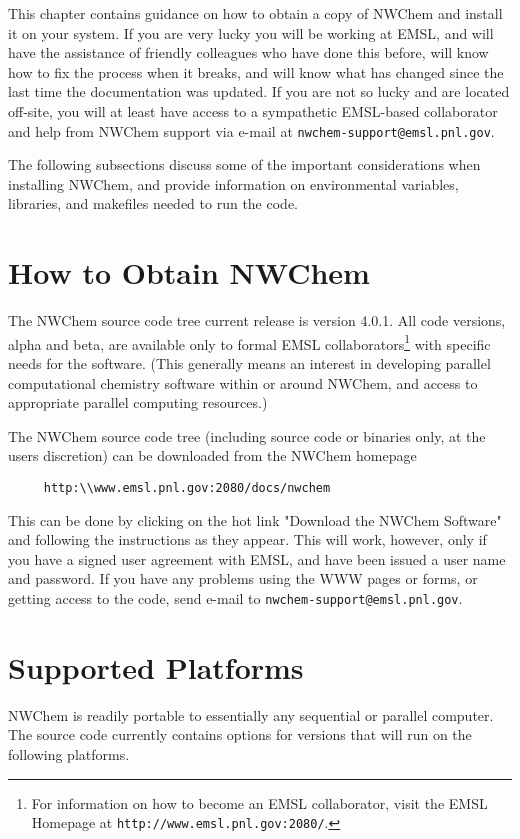 \label{sec:install}

This chapter contains guidance on how to obtain a copy of NWChem and
install it on your system.  If you are very lucky you will be working
at EMSL, and will have the assistance of friendly colleagues who have
done this before, will know how to fix the process when it breaks,
and will know what has changed since the last time the documentation
was updated.
If you are not so lucky and are located off-site, you will at least have
access to a sympathetic EMSL-based collaborator and help from NWChem 
support via e-mail at {\tt nwchem-support@emsl.pnl.gov}.

The following subsections discuss some of the important considerations
when installing NWChem, and provide information on environmental
variables, libraries, and makefiles needed to run the code.

\section{How to Obtain NWChem}

The NWChem source code tree current release is version 4.0.1.  All code versions, alpha and
beta, are available only to formal EMSL collaborators\footnote{For information on
how to become an EMSL collaborator, visit the EMSL Homepage at 
\verb+http://www.emsl.pnl.gov:2080/+.} with specific
needs for the software.  (This generally means an interest in developing
parallel computational chemistry software within or around NWChem, and
access to appropriate parallel computing resources.)

The NWChem source code tree (including source code or binaries only, at the
users discretion) can be downloaded from the NWChem homepage 

\begin{verbatim}
     http:\\www.emsl.pnl.gov:2080/docs/nwchem
\end{verbatim}

This can be done by clicking on the hot link "Download the NWChem Software" and following the
instructions as they appear.  This will work, however, only if you have
a signed user agreement
with EMSL, and have been issued a user name and password.  If you have any problems
using the WWW pages or forms, or getting access to the code, send e-mail to
{\tt nwchem-support@emsl.pnl.gov}.

\section{Supported Platforms}
\label{sec:platforms}
NWChem is readily portable to essentially any sequential or parallel computer.  
The source code currently contains options for versions that will run
on the following platforms.

